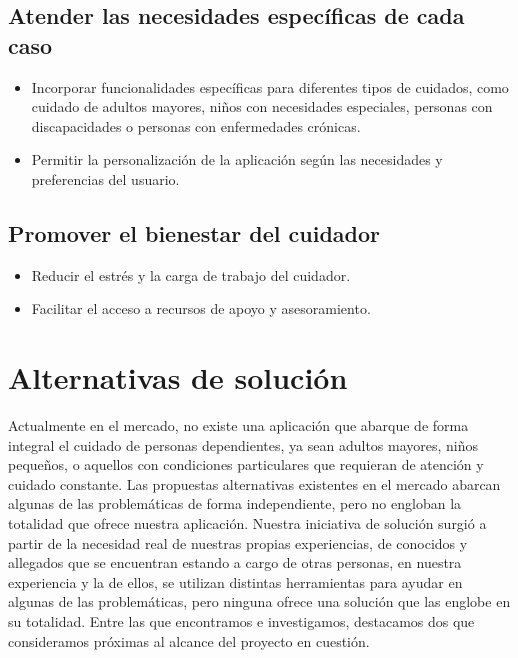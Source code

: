 \documentclass[a4paper,12pt]{article}
\begin{document}
    \subsection{Atender las necesidades específicas de cada caso}
    \begin{itemize}
        \item Incorporar funcionalidades específicas para diferentes tipos de cuidados, como cuidado de adultos mayores, niños con necesidades especiales, personas con discapacidades o personas con enfermedades crónicas.
        \item Permitir la personalización de la aplicación según las necesidades y preferencias del usuario.
    \end{itemize}
    \subsection{Promover el bienestar del cuidador}
    \begin{itemize}
        \item Reducir el estrés y la carga de trabajo del cuidador.
        \item Facilitar el acceso a recursos de apoyo y asesoramiento.
    \end{itemize}

    \newpage
    
    \section{Alternativas de solución}
    Actualmente en el mercado, no existe una aplicación que abarque de forma integral el cuidado de personas dependientes, ya sean adultos mayores, niños pequeños, o aquellos con condiciones particulares que requieran de atención y cuidado constante.\newline
    Las propuestas alternativas existentes en el mercado abarcan algunas de las problemáticas de forma independiente, pero no engloban la totalidad que ofrece nuestra aplicación.\newline
    Nuestra iniciativa de solución surgió a partir de la necesidad real de nuestras propias experiencias, de conocidos y allegados que se encuentran estando a cargo de otras personas, en nuestra experiencia y la de ellos, se utilizan distintas herramientas para ayudar en algunas de las problemáticas, pero ninguna ofrece una solución que las englobe en su totalidad.\newline
    Entre las que encontramos e investigamos, destacamos dos que consideramos próximas al alcance del proyecto en cuestión.
\end{document}

